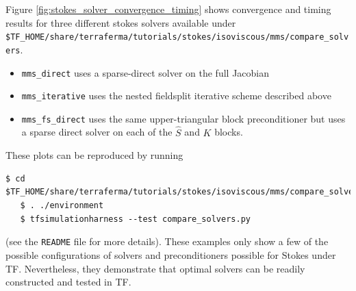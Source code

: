 Figure \ref{fig:stokes_solver_convergence_timing}  shows convergence
and timing results for three different stokes solvers available under
\texttt{\$TF\_HOME/share/terraferma/tutorials/stokes/isoviscous/mms/compare\_solvers}.
\begin{itemize}
\item \texttt{mms\_direct} uses a sparse-direct solver on the full Jacobian
\item \texttt{mms\_iterative} uses the nested fieldsplit iterative
  scheme described above
\item \texttt{mms\_fs\_direct} uses the same upper-triangular block
  preconditioner but uses a sparse direct solver on each of the
  $\hat{S}$ and $K$ blocks.
\end{itemize}
These plots can be reproduced by running
\begin{lstlisting}[style=Bash]
   $ cd $TF_HOME/share/terraferma/tutorials/stokes/isoviscous/mms/compare_solvers
   $ . ./environment
   $ tfsimulationharness --test compare_solvers.py 
 \end{lstlisting} %
 (see the \texttt{README} file for more details).
These examples only show a few of the possible configurations of
solvers and preconditioners possible for Stokes under
TF. Nevertheless,  they demonstrate that optimal solvers can be
readily constructed and tested in TF.  


